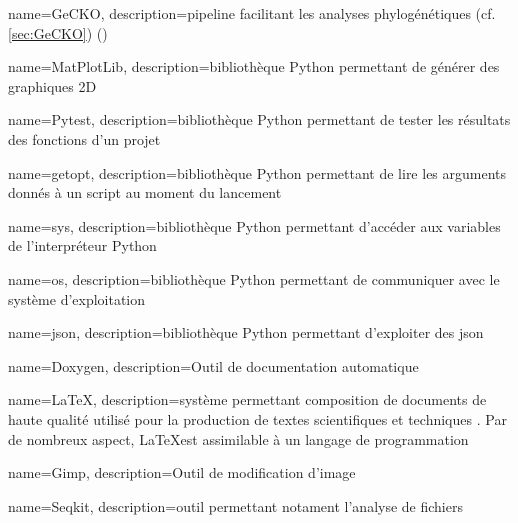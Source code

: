  {
    name=GeCKO,
    description={pipeline facilitant les analyses phylogénétiques (cf. \cref{sec:GeCKO}) (\cite{ardisson_gecko_2024})}
}
\newcommand{\GeCKO}{\gls{GeCKO}}


 {
    name=MatPlotLib,
    description={bibliothèque \gls{Python} permettant de générer des graphiques 2D \cite{matplotlib}}
}
\newcommand{\MatPlotLib}{\gls{MatPlotLib}}

 {
    name=Pytest,
    description={bibliothèque \gls{Python} permettant de tester les résultats des fonctions d'un projet \cite{pytest}}
}
\newcommand{\Pytest}{\gls{Pytest}}
\newcommand{\pytest}{\gls{Pytest}}


\newcommand{\bashrc}{"\gls{bashrc}"}



 {
    name=getopt,
    description={bibliothèque \gls{Python} permettant de lire les arguments donnés à un script au moment du lancement \cite{getopt}}
}
\newcommand{\getopts}{\gls{getopts}}

 {
    name=sys,
    description={bibliothèque \gls{Python} permettant d'accéder aux variables de l'interpréteur \gls{Python} \cite{sys}}
}

 {
    name=os,
    description={bibliothèque \gls{Python} permettant de communiquer avec le système d'exploitation \cite{os}}
}

 {
    name=json,
    description={bibliothèque \gls{Python} permettant d'exploiter des \gls{json} \cite{json}}
}





 {
    name=Doxygen,
    description={Outil de documentation automatique \cite{doxygen}}
}
\newcommand{\Doxygen}{\gls{Doxygen}}


 {
    name=\LaTeX,
    description={système permettant composition de documents de haute qualité utilisé pour la production de textes scientifiques et techniques \cite{latex}. Par de nombreux aspect, \LaTeX est assimilable à un langage de programmation}
}
\newcommand{\Latex}{\gls{Latex}}

 {
    name=Gimp,
    description={Outil de modification d'image \cite{gimp}}
}
\newcommand{\gimp}{\gls{gimp}}

 {
    name=Seqkit,
    description={outil permettant notament l'analyse de fichiers \fastq\,\cite{seqkit1} \cite{seqkit2}}
}

